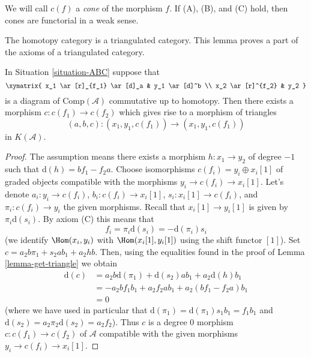 \noindent
We will call $c(f)$ a {\it cone} of the morphism $f$.
If (A), (B), and (C) hold, then
cones are functorial in a weak sense.

\begin{lemma}
\label{lemma-cone}
\begin{slogan}
The homotopy category is a triangulated category.
This lemma proves a part of the axioms of a triangulated category.
\end{slogan}
In Situation \ref{situation-ABC} suppose that
$$
\xymatrix{
x_1 \ar[r]_{f_1} \ar[d]_a & y_1 \ar[d]^b \\
x_2 \ar[r]^{f_2} & y_2
}
$$
is a diagram of $\text{Comp}(\mathcal{A})$ commutative up to homotopy.
Then there exists a morphism $c : c(f_1) \to c(f_2)$ which gives rise to
a morphism of triangles
$$
(a, b, c) : (x_1, y_1, c(f_1)) \to (x_1, y_1, c(f_1))
$$
in $K(\mathcal{A})$.
\end{lemma}

\begin{proof}
The assumption means there exists a morphism $h : x_1 \to y_2$ of degree
$-1$ such that $\text{d}(h) = b f_1 - f_2 a$. Choose isomorphisms
$c(f_i) = y_i \oplus x_i[1]$ of graded objects compatible with the
morphisms $y_i \to c(f_i) \to x_i[1]$. Let's denote
$a_i : y_i \to c(f_i)$, $b_i : c(f_i) \to x_i[1]$, $s_i : x_i[1] \to c(f_i)$,
and $\pi_i : c(f_i) \to y_i$ the given morphisms. Recall that
$x_i[1] \to y_i[1]$ is given by $\pi_i \text{d}(s_i)$. By axiom (C)
this means that
$$
f_i = \pi_i \text{d}(s_i) = - \text{d}(\pi_i) s_i
$$
(we identify $\Hom(x_i, y_i)$ with $\Hom(x_i[1], y_i[1])$
using the shift functor $[1]$).
Set $c = a_2 b \pi_1 + s_2 a b_1 + a_2hb$. Then, using the
equalities found in the proof of Lemma \ref{lemma-get-triangle}
we obtain
\begin{align*}
\text{d}(c)
& =
a_2 b \text{d}(\pi_1) + \text{d}(s_2) a b_1 + a_2 \text{d}(h) b_1 \\
& =
- a_2 b f_1 b_1 + a_2 f_2 a b_1 + a_2 (b f_1 - f_2 a) b_1 \\
& = 0
\end{align*}
(where we have used in particular that
$\text{d}(\pi_1) = \text{d}(\pi_1) s_1 b_1 = f_1 b_1$ and
$\text{d}(s_2) = a_2 \pi_2 \text{d}(s_2) = a_2 f_2$).
Thus $c$ is a degree $0$ morphism $c : c(f_1) \to c(f_2)$ of $\mathcal{A}$
compatible with the given morphisms $y_i \to c(f_i) \to x_i[1]$.
\end{proof}

